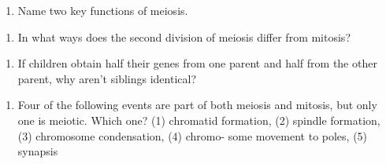 \documentclass[11pt,]{article}
\providecommand{\tightlist}{%
  \setlength{\itemsep}{0pt}\setlength{\parskip}{0pt}}
\begin{document}
\begin{blackbox}

\begin{enumerate}
\def\labelenumi{\arabic{enumi}.}
\setcounter{enumi}{18}
\tightlist
\item
  Name two key functions of meiosis.
\end{enumerate}

\vspace{19cm}

\end{blackbox}

\begin{blackbox}

\begin{enumerate}
\def\labelenumi{\arabic{enumi}.}
\setcounter{enumi}{21}
\tightlist
\item
  In what ways does the second division of meiosis differ from mitosis?
\end{enumerate}

\vspace{19cm}

\end{blackbox}

\begin{blackbox}

\begin{enumerate}
\def\labelenumi{\arabic{enumi}.}
\setcounter{enumi}{26}
\tightlist
\item
  If children obtain half their genes from one parent and half from the
  other parent, why aren't siblings identical?
\end{enumerate}

\vspace{19cm}

\end{blackbox}

\begin{blackbox}

\begin{enumerate}
\def\labelenumi{\arabic{enumi}.}
\setcounter{enumi}{29}
\tightlist
\item
  Four of the following events are part of both meiosis and mitosis, but
  only one is meiotic. Which one? (1) chromatid formation, (2) spindle
  formation, (3) chromosome condensation, (4) chromo- some movement to
  poles, (5) synapsis
\end{enumerate}

\vspace{17cm}

\end{blackbox}
\end{document}
